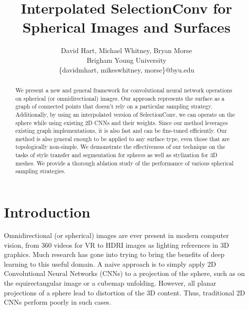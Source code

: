 \documentclass[10pt,twocolumn,letterpaper]{article}
\begin{document}
\title{Interpolated SelectionConv for Spherical Images and Surfaces}

\author{David Hart, Michael Whitney, Bryan Morse\\
Brigham Young University\\ {\{davidmhart, mikeswhitney, morse\}@byu.edu}
}

\maketitle
\thispagestyle{empty}

\begin{abstract}
    We present a new and general framework for convolutional neural network operations on spherical (or omnidirectional) images. Our approach represents the surface as a graph of connected points that doesn't rely on a particular sampling strategy. Additionally, by using an interpolated version of SelectionConv, we can operate on the sphere while using existing 2D CNNs and their weights. Since our method leverages existing graph implementations, it is also fast and can be fine-tuned efficiently. Our method is also general enough to be applied to any surface type, even those that are topologically non-simple. We demonstrate the effectiveness of our technique on the tasks of style transfer and segmentation for spheres as well as stylization for 3D meshes. We provide a thorough ablation study of the performance of various spherical sampling strategies.
\end{abstract}

\section{Introduction}


Omnidirectional (or spherical) images are ever present in modern computer vision, from 360 videos for VR to HDRI images as lighting references in 3D graphics. Much research has gone into trying to bring the benefits of deep learning to this useful domain. A naive approach is to simply apply 2D Convolutional Neural Networks (CNNs) to a projection of the sphere, such as on the equirectangular image or a cubemap unfolding. However, all planar projections of a sphere lead to distortion of the 3D content. Thus, traditional 2D CNNs perform poorly in such cases.
\end{document}
